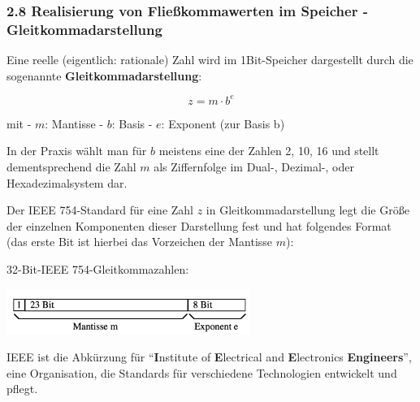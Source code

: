 \documentclass[
  11pt,
  a4paper,
  DIV=11,
  numbers=noendperiod]{scrartcl}
\begin{document}
\subsubsection{2.8 Realisierung von Fließkommawerten im Speicher -
Gleitkommadarstellung}\label{realisierung-von-flieuxdfkommawerten-im-speicher---gleitkommadarstellung}

\begin{tcolorbox}[enhanced jigsaw, coltitle=black, left=2mm, opacityback=0, colframe=quarto-callout-note-color-frame, arc=.35mm, colback=white, bottomrule=.15mm, breakable, rightrule=.15mm, colbacktitle=quarto-callout-note-color!10!white, title=\textcolor{quarto-callout-note-color}{\faInfo}\hspace{0.5em}{Definition}, titlerule=0mm, toptitle=1mm, leftrule=.75mm, opacitybacktitle=0.6, bottomtitle=1mm, toprule=.15mm]

Eine reelle (eigentlich: rationale) Zahl wird im 1Bit-Speicher
dargestellt durch die sogenannte \textbf{Gleitkommadarstellung}:

\[z = m \cdot b^e\]

mit - \(m\): Mantisse - \(b\): Basis - \(e\): Exponent (zur Basis b)

In der Praxis wählt man für \(b\) meistens eine der Zahlen 2, 10, 16 und
stellt dementsprechend die Zahl \(m\) als Ziffernfolge im Dual-,
Dezimal-, oder Hexadezimalsystem dar.

\end{tcolorbox}

Der IEEE 754-Standard für eine Zahl \(z\) in Gleitkommadarstellung legt
die Größe der einzelnen Komponenten dieser Darstellung fest und hat
folgendes Format (das erste Bit ist hierbei das Vorzeichen der Mantisse
\(m\)):

32-Bit-IEEE 754-Gleitkommazahlen:

\includegraphics[width=3.125in,height=\textheight,keepaspectratio]{images/floatdarstellung.jpg}

\begin{tcolorbox}[enhanced jigsaw, coltitle=black, left=2mm, opacityback=0, colframe=quarto-callout-tip-color-frame, arc=.35mm, colback=white, bottomrule=.15mm, breakable, rightrule=.15mm, colbacktitle=quarto-callout-tip-color!10!white, title=\textcolor{quarto-callout-tip-color}{\faLightbulb}\hspace{0.5em}{INFO}, titlerule=0mm, toptitle=1mm, leftrule=.75mm, opacitybacktitle=0.6, bottomtitle=1mm, toprule=.15mm]

IEEE ist die Abkürzung für ``\textbf{I}nstitute of \textbf{E}lectrical
and \textbf{E}lectronics \textbf{Engineers}'', eine Organisation, die
Standards für verschiedene Technologien entwickelt und pflegt.

\end{tcolorbox}
\end{document}
